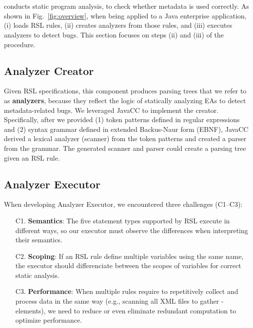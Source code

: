 \vspace{-.5em}
\section{\tool}\label{se:mecheck}
{\tool conducts {static program} analysis, to check whether metadata is used correctly. }
As shown in Fig.~\ref{fig:overview}, 
when being applied to a Java enterprise application, 
\tool (i) loads RSL rules, (ii) creates analyzers from those rules, and (iii) executes analyzers {to detect bugs.} This section focuses on steps (ii) and (iii) of the procedure. 

\vspace{-.5em}
\subsection{Analyzer Creator}
Given RSL specifications, this component produces parsing trees that we refer to as \textbf{analyzers}, because they reflect the logic of statically analyzing EAs to detect metadata-related bugs. We leveraged JavaCC \cite{javaCC_page} to implement the creator. 
Specifically, after we provided (1) token patterns defined in regular expressions and (2) syntax grammar defined in extended Backus-Naur form (EBNF), JavaCC derived a lexical analyzer (scanner) from the token patterns and created a parser from the grammar. 
The generated scanner and parser could create a parsing tree given an RSL rule. 

\vspace{-0.5em}
\subsection{Analyzer Executor}
When developing Analyzer Executor, we encountered three challenges (C1--C3):

\begin{itemize}
\item[C1.] \textbf{Semantics}: The five statement types supported by RSL {execute in different ways}, so our executor must observe the differences when interpreting their semantics.
\item[C2.] \textbf{Scoping}: If an RSL rule define multiple variables using the same name, 
the executor should 
differenciate between the scopes of variables 
for correct static analysis. 
\item[C3.] \textbf{{Performance}}: When multiple rules require \tool to repetitively collect and process data in the same way (e.g., scanning all XML files to gather -elements), we need to reduce or even eliminate redundant computation to optimize performance.
\end{itemize}

